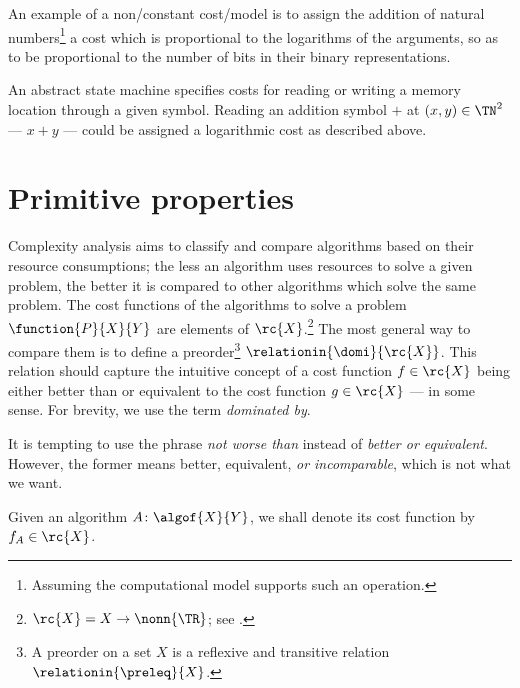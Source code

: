 \documentclass[b5paper, english, oneside]{memoir}
\begin{document}
\begin{example}
An example of a non\-/constant cost\-/model is to assign the addition of natural numbers\footnote{Assuming the computational model supports such an operation.} a cost which is proportional to the logarithms of the arguments, so as to be proportional to the number of bits in their binary representations. 
\end{example}

\begin{example}
An abstract state machine specifies costs for reading or writing a memory location through a given symbol. Reading an addition symbol $+$ at $(x, y) \in \TN^2$ --- $x + y$ --- could be assigned a logarithmic cost as described above.
\end{example}

\section{Primitive properties}

Complexity analysis aims to classify and compare algorithms based on their resource consumptions; the less an algorithm uses resources to solve a given problem, the better it is compared to other algorithms which solve the same problem. The cost functions of the algorithms to solve a problem $\function{P}{X}{Y}$ are elements of $\rc{X}$.\footnote{$\rc{X} = X \to \nonn{\TR}$; see .} The most general way to compare them is to define a preorder\footnote{A preorder on a set $X$ is a reflexive and transitive relation $\relationin{\preleq}{X}$.} $\relationin{\domi}{\rc{X}}$. This relation should capture the intuitive concept of a cost function $f \in \rc{X}$ being either better than or equivalent to the cost function $g \in \rc{X}$ --- in some sense. For brevity, we use the term \emph{dominated by}.

\begin{note}
It is tempting to use the phrase \emph{not worse than} instead of \emph{better or equivalent}. However, the former means better, equivalent, \emph{or incomparable}, which is not what we want.
\end{note}

\begin{note}
Given an algorithm $A \colon \algof{X}{Y}$, we shall denote its cost function by $f_A \in \rc{X}$.
\end{note}
\end{document}
